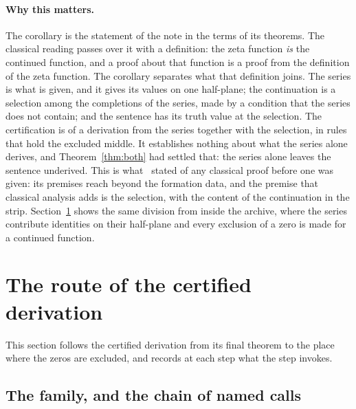\documentclass[11pt]{article}
\theoremstyle{definition}
\theoremstyle{remark}
\begin{document}
\paragraph{Why this matters.} The corollary is the statement of the note in the terms of its theorems. The classical reading passes over it with a definition: the zeta function \emph{is} the continued function, and a proof about that function is a proof from the definition of the zeta function. The corollary separates what that definition joins. The series is what is given, and it gives its values on one half-plane; the continuation is a selection among the completions of the series, made by a condition that the series does not contain; and the sentence has its truth value at the selection. The certification is of a derivation from the series together with the selection, in rules that hold the excluded middle. It establishes nothing about what the series alone derives, and Theorem~\ref{thm:both} had settled that: the series alone leaves the sentence underived. This is what~\citet{tv} stated of any classical proof before one was given: its premises reach beyond the formation data, and the premise that classical analysis adds is the selection, with the content of the continuation in the strip. Section~\ref{sec:route} shows the same division from inside the archive, where the series contribute identities on their half-plane and every exclusion of a zero is made for a continued function.


\section{The route of the certified derivation}\label{sec:route}

This section follows the certified derivation from its final theorem to the place where the zeros are excluded, and records at each step what the step invokes.

\subsection{The family, and the chain of named calls}
\end{document}
